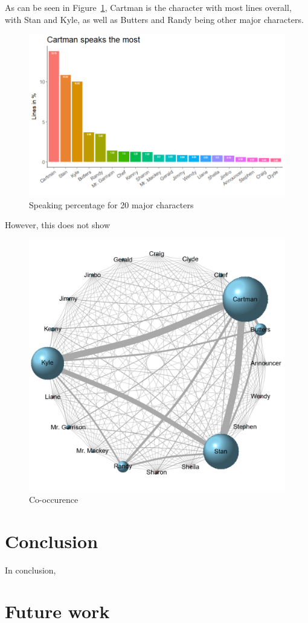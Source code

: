 \documentclass[10pt,a4paper]{article}
\begin{document}
	As can be seen in Figure~\ref{fig:SpeakingPercentage}, Cartman is the character with most lines overall, with Stan and Kyle, as well as Butters and Randy being other major characters.
	
	\begin{figure}[h]
	\centering
	\includegraphics[scale=0.5]{images/speakingPercentage.png}
	\caption{Speaking percentage for 20 major characters}
	\label{fig:SpeakingPercentage}
	\end{figure}	
	
	However, this does not show 
	
		
	
		
	
	
	\begin{figure}[h]
	\centering
	\includegraphics[scale=0.6]{images/CoOccurenceMatrix.png}
	\caption{Co-occurence }
	\label{fig:WordCloud-ngram}
	\end{figure}	
	\section{Conclusion}
	In conclusion, 

	\section{Future work}
\end{document}
